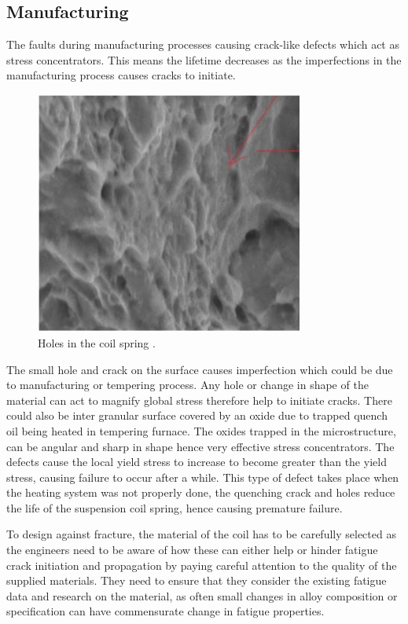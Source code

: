 \documentclass[11pt]{article}
\begin{document}
\subsection{Manufacturing}
The faults during manufacturing processes causing crack-like defects which act as stress concentrators. This means the lifetime decreases as the imperfections in the manufacturing process causes cracks to initiate. 
\begin{figure}[H]
    \centering
    \includegraphics[height = 8cm]{./img/cracks1.png}
    \caption{Holes in the coil spring \cite{b14}.}
    \label{fig:fatigue1}
\end{figure}
The small hole and crack on the surface causes imperfection which could be due to manufacturing or tempering process. Any hole or change in shape of the material can act to magnify global stress therefore help to initiate cracks. There could also be inter granular surface covered by an oxide due to trapped quench oil being heated in tempering furnace. The oxides trapped in the microstructure, can be angular and sharp in shape hence very effective stress concentrators. The defects cause the local yield stress to increase to become greater than the yield stress, causing failure to occur after a while. This type of defect takes place when the heating system was not properly done, the quenching crack and holes reduce the life of the suspension coil spring, hence causing premature failure.  
 

To design against fracture, the material of the coil has to be carefully selected as the engineers need to be aware of how these can either help or hinder fatigue crack initiation and propagation by paying careful attention to the quality of the supplied materials. They need to ensure that they consider the existing fatigue data and research on the material, as often small changes in alloy composition or specification can have commensurate change in fatigue properties.  
\end{document}
